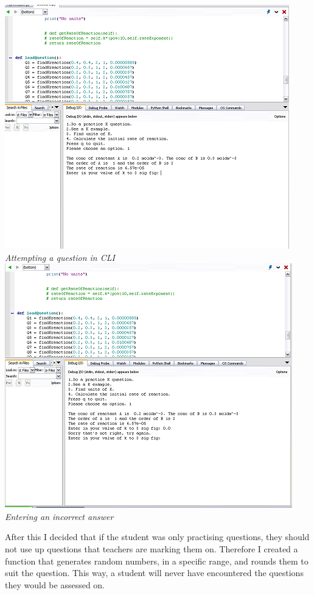 \documentclass[a4paper,12pt]{report}
\begin{document}
\includegraphics{CLI02}\\
\emph{Attempting a question in CLI}\\
\includegraphics{CLI03}\\
\emph{Entering an incorrect answer}\\
\bigskip

After this I decided that if the student was only practising questions, they should not use up questions that teachers are marking them on. Therefore I created a function that generates random numbers, in a specific range, and rounds them to suit the question. This way, a student will never have encountered the questions they would be assessed on.
\end{document}
